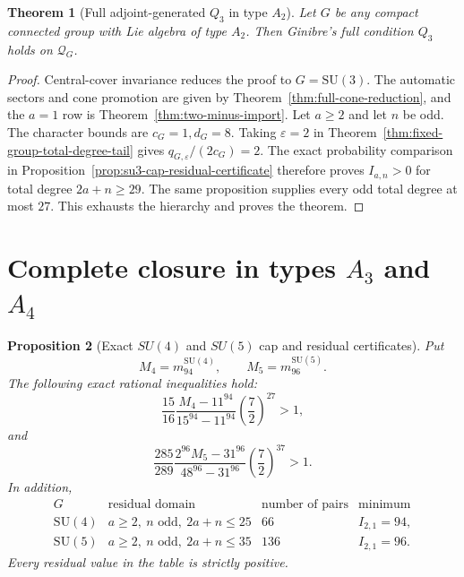 \documentclass[11pt,reqno]{amsart}
\theoremstyle{plain}
\newtheorem{theorem}{Theorem}[section]
\newtheorem{proposition}[theorem]{Proposition}
\theoremstyle{definition}
\newcommand{\Qcone}{\mathcal Q}
\begin{document}
\begin{theorem}[Full adjoint-generated $Q_3$ in type $A_2$]
\label{thm:su3-full-cone}
Let $G$ be any compact connected group with Lie algebra of type $A_2$.
Then Ginibre's full condition $Q_3$ holds on $\Qcone_G$.
\end{theorem}

\begin{proof}
Central-cover invariance reduces the proof to $G=\mathrm{SU}(3)$.  The
automatic sectors and cone promotion are given by
Theorem~\ref{thm:full-cone-reduction}, and the $a=1$ row is
Theorem~\ref{thm:two-minus-import}.  Let $a\geq2$ and let $n$ be odd.  The character
bounds are $c_G=1,d_G=8$.  Taking $\varepsilon=2$ in
Theorem~\ref{thm:fixed-group-total-degree-tail} gives
$q_{G,\varepsilon}/(2c_G)=2$.  The exact probability comparison in
Proposition~\ref{prop:su3-cap-residual-certificate} therefore proves
$I_{a,n}>0$ for total degree $2a+n\geq29$.  The same proposition supplies
every odd total degree at most $27$.  This exhausts the hierarchy and proves
the theorem.
\end{proof}

\section{Complete closure in types \texorpdfstring{$A_3$ and $A_4$}{A3 and A4}}

\begin{proposition}[Exact $SU(4)$ and $SU(5)$ cap and residual certificates]
\label{prop:su45-cap-residual-certificate}
Put
\[
 M_4=m_{94}^{\mathrm{SU}(4)},\qquad
 M_5=m_{96}^{\mathrm{SU}(5)}.
\]
The following exact rational inequalities hold:
\[
 \frac{15}{16}
 \frac{M_4-11^{94}}{15^{94}-11^{94}}
 \left(\frac72\right)^{27}>1,
\]
and
\[
 \frac{285}{289}
 \frac{2^{96}M_5-31^{96}}{48^{96}-31^{96}}
 \left(\frac72\right)^{37}>1.
\]
In addition,
\[
 \begin{array}{c|c|c|c}
 G&\text{residual domain}&\text{number of pairs}&\text{minimum}\\
 \hline
 \mathrm{SU}(4)&a\geq2,\ n\text{ odd},\ 2a+n\leq25
   &66&I_{2,1}=94,\\
 \mathrm{SU}(5)&a\geq2,\ n\text{ odd},\ 2a+n\leq35
   &136&I_{2,1}=96.
 \end{array}
\]
Every residual value in the table is strictly positive.
\end{proposition}
\end{document}
